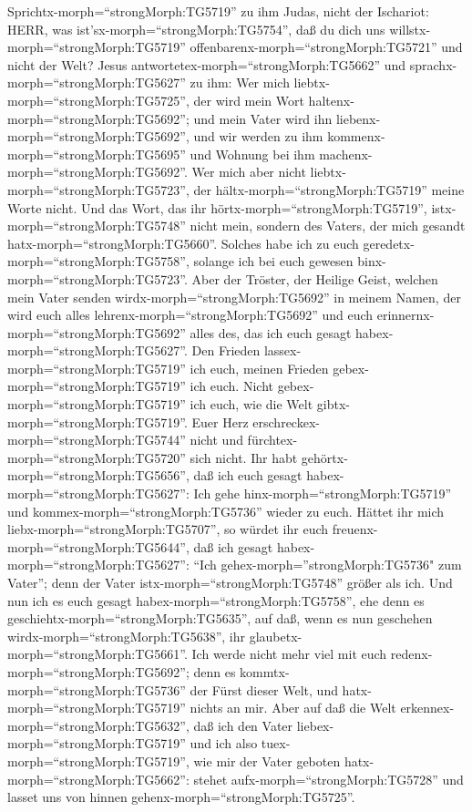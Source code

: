 Sprichtx-morph=``strongMorph:TG5719'' zu ihm Judas, nicht der Ischariot:
HERR, was ist'sx-morph=``strongMorph:TG5754'', daß du dich uns
willstx-morph=``strongMorph:TG5719''
offenbarenx-morph=``strongMorph:TG5721'' und nicht der Welt?
 Jesus antwortetex-morph=``strongMorph:TG5662'' und
sprachx-morph=``strongMorph:TG5627'' zu ihm: Wer mich
liebtx-morph=``strongMorph:TG5725'', der wird mein Wort
haltenx-morph=``strongMorph:TG5692''; und mein Vater wird ihn
liebenx-morph=``strongMorph:TG5692'', und wir werden zu ihm
kommenx-morph=``strongMorph:TG5695'' und Wohnung bei ihm
machenx-morph=``strongMorph:TG5692''.  Wer mich aber nicht
liebtx-morph=``strongMorph:TG5723'', der
hältx-morph=``strongMorph:TG5719'' meine Worte nicht. Und das Wort, das
ihr hörtx-morph=``strongMorph:TG5719'',
istx-morph=``strongMorph:TG5748'' nicht mein, sondern des Vaters, der
mich gesandt hatx-morph=``strongMorph:TG5660''.  Solches
habe ich zu euch geredetx-morph=``strongMorph:TG5758'', solange ich bei
euch gewesen binx-morph=``strongMorph:TG5723''.  Aber der
Tröster, der Heilige Geist, welchen mein Vater senden
wirdx-morph=``strongMorph:TG5692'' in meinem Namen, der wird euch alles
lehrenx-morph=``strongMorph:TG5692'' und euch
erinnernx-morph=``strongMorph:TG5692'' alles des, das ich euch gesagt
habex-morph=``strongMorph:TG5627''.  Den Frieden
lassex-morph=``strongMorph:TG5719'' ich euch, meinen Frieden
gebex-morph=``strongMorph:TG5719'' ich euch. Nicht
gebex-morph=``strongMorph:TG5719'' ich euch, wie die Welt
gibtx-morph=``strongMorph:TG5719''. Euer Herz
erschreckex-morph=``strongMorph:TG5744'' nicht und
fürchtex-morph=``strongMorph:TG5720'' sich nicht.  Ihr habt
gehörtx-morph=``strongMorph:TG5656'', daß ich euch gesagt
habex-morph=``strongMorph:TG5627'': Ich gehe
hinx-morph=``strongMorph:TG5719'' und
kommex-morph=``strongMorph:TG5736'' wieder zu euch. Hättet ihr mich
liebx-morph=``strongMorph:TG5707'', so würdet ihr euch
freuenx-morph=``strongMorph:TG5644'', daß ich gesagt
habex-morph=``strongMorph:TG5627'': ``Ich
gehex-morph=''strongMorph:TG5736" zum Vater''; denn der Vater
istx-morph=``strongMorph:TG5748'' größer als ich.  Und nun
ich es euch gesagt habex-morph=``strongMorph:TG5758'', ehe denn es
geschiehtx-morph=``strongMorph:TG5635'', auf daß, wenn es nun geschehen
wirdx-morph=``strongMorph:TG5638'', ihr
glaubetx-morph=``strongMorph:TG5661''.  Ich werde nicht
mehr viel mit euch redenx-morph=``strongMorph:TG5692''; denn es
kommtx-morph=``strongMorph:TG5736'' der Fürst dieser Welt, und
hatx-morph=``strongMorph:TG5719'' nichts an mir.  Aber auf
daß die Welt erkennex-morph=``strongMorph:TG5632'', daß ich den Vater
liebex-morph=``strongMorph:TG5719'' und ich also
tuex-morph=``strongMorph:TG5719'', wie mir der Vater geboten
hatx-morph=``strongMorph:TG5662'': stehet
aufx-morph=``strongMorph:TG5728'' und lasset uns von hinnen
gehenx-morph=``strongMorph:TG5725''.

